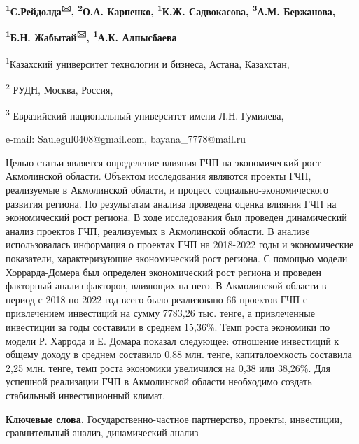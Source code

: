 
\begin{center}
{\bfseries \textsuperscript{1}С.Рейдолда\textsuperscript{🖂},
\textsuperscript{2}О.А. Карпенко, \textsuperscript{1}К.Ж. Садвокасова,
\textsuperscript{3}А.М. Бержанова,}

{\bfseries \textsuperscript{1}Б.Н. Жабытай\textsuperscript{🖂},
\textsuperscript{1}А.К. Алпысбаева}

\textsuperscript{1}Казахский университет технологии и бизнеса, Астана,
Казахстан,

\textsuperscript{2} РУДН, Москва, Россия,

\textsuperscript{3} Евразийский национальный университет имени Л.Н.
Гумилева,

e-mail: Saulegul0408@gmail.com, bayana\_7778@mail.ru
\end{center}

Целью статьи является определение влияния ГЧП на экономический рост
Акмолинской области. Объектом исследования являются проекты ГЧП,
реализуемые в Акмолинской области, и процесс социально-экономического
развития региона. По результатам анализа проведена оценка влияния ГЧП на
экономический рост региона. В ходе исследования был проведен
динамический анализ проектов ГЧП, реализуемых в Акмолинской области. В
анализе использовалась информация о проектах ГЧП на 2018-2022 годы и
экономические показатели, характеризующие экономический рост региона. С
помощью модели Хоррарда-Домера был определен экономический рост региона
и проведен факторный анализ факторов, влияющих на него. В Акмолинской
области в период с 2018 по 2022 год всего было реализовано 66 проектов
ГЧП с привлечением инвестиций на сумму 7783,26 тыс. тенге, а
привлеченные инвестиции за годы составили в среднем 15,36\%. Темп роста
экономики по модели Р. Харрода и Е. Домара показал следующее: отношение
инвестиций к общему доходу в среднем составило 0,88 млн. тенге,
капиталоемкость составила 2,25 млн. тенге, темп роста экономики
увеличился на 0,38 или 38,26\%. Для успешной реализации ГЧП в
Акмолинской области необходимо создать стабильный инвестиционный климат.

{\bfseries Ключевые слова.} Государственно-частное партнерство, проекты,
инвестиции, сравнительный анализ, динамический анализ


